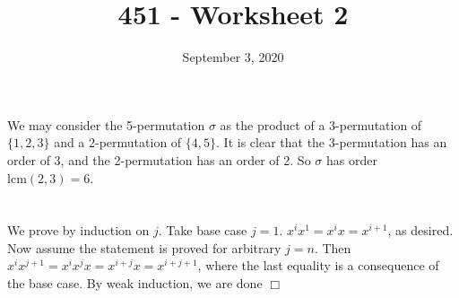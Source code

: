 \documentclass{article}
\title{451 - Worksheet 2}
\date{September 3, 2020}
\begin{document}
\maketitle

\section{}
We may consider the 5-permutation $\sigma$ as the product of a 3-permutation of $\{1,2,3\}$ and a 2-permutation of $\{4,5\}$. It is clear that the 3-permutation has an order of 3, and the 2-permutation has an order of 2. So $\sigma$ has order $\mathrm{lcm}(2,3) = 6$.

\section{}
We prove by induction on $j$. Take base case $j = 1$. $x^ix^1 = x^ix = x^{i+1}$, as desired. Now assume the statement is proved for arbitrary $j = n$. Then $x^ix^{j+1} = x^ix^jx = x^{i+j}x = x^{i+j+1}$, where the last equality is a consequence of the base case. By weak induction, we are done $\Box$
\end{document}
